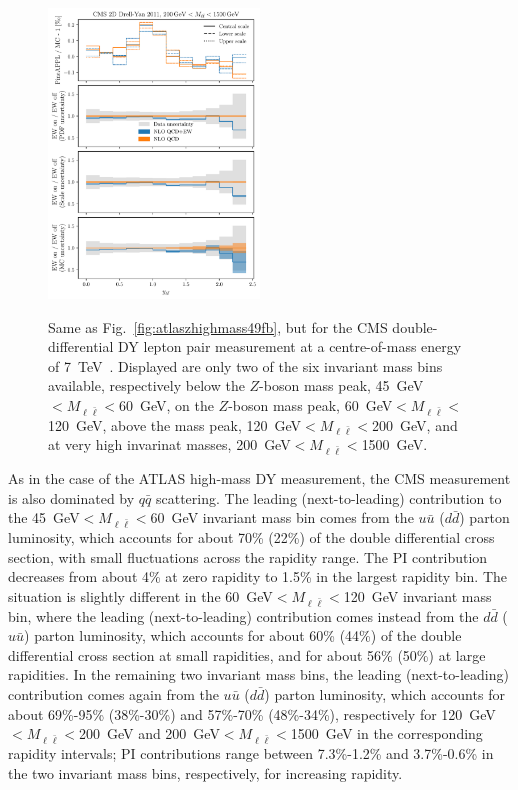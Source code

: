 \begin{figure}[!p]
    \includegraphics[width=0.5\textwidth]{figures/pineappl_CMSDY2D11_bin6}\\
    \caption{Same as Fig.~\ref{fig:atlaszhighmass49fb}, but for the CMS
      double-differential DY lepton pair measurement at a centre-of-mass energy
      of 7~TeV~\cite{Chatrchyan:2013tia}. Displayed are only two of the six
      invariant mass bins available, respectively below the $Z$-boson mass peak,
      45~GeV$<M_{\ell\bar\ell}<$60~GeV, on the $Z$-boson mass peak,
      60~GeV$<M_{\ell\bar\ell}<$120~GeV, above the mass peak,
      120~GeV$<M_{\ell\bar\ell}<$200~GeV, and at very high invarinat masses,
      200~GeV$<M_{\ell\bar\ell}<$1500~GeV.}
    \label{fig:cmsdy2d11_bins3456}
\end{figure}

As in the case of the ATLAS high-mass DY measurement, the CMS measurement is
also dominated by $q\bar{q}$ scattering. The leading (next-to-leading)
contribution to the 45~GeV$<M_{\ell\bar\ell}<$60~GeV invariant mass bin comes from
the $u\bar{u}$ ($d\bar{d}$) parton luminosity, which accounts for about 70\%
(22\%) of the double differential cross section, with small fluctuations across
the rapidity range. The PI contribution decreases from about 4\% at zero
rapidity to 1.5\% in the largest rapidity bin. The situation is slightly
different in the 60~GeV$<M_{\ell\bar\ell}<$120~GeV invariant mass bin, where the
leading (next-to-leading) contribution comes instead from the $d\bar{d}$
($u\bar{u}$) parton luminosity, which accounts for about 60\% (44\%) of the
double differential cross section at small rapidities, and for about 56\% (50\%)
at large rapidities. In the remaining two invariant mass bins, the leading
(next-to-leading) contribution comes again from the $u\bar{u}$ ($d\bar{d}$)
parton luminosity, which accounts for about 69\%-95\% (38\%-30\%) and
57\%-70\% (48\%-34\%), respectively for 120~GeV$<M_{\ell\bar\ell}<$200~GeV and
200~GeV$<M_{\ell\bar\ell}<$1500~GeV in the corresponding rapidity intervals; PI
contributions range between 7.3\%-1.2\% and 3.7\%-0.6\% in the two invariant
mass bins, respectively, for increasing rapidity.

